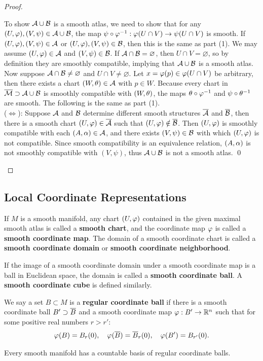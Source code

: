 \begin{proof}
\begin{enumerate}
    To show $\mathcal{A} \cup \mathcal{B}$ is a smooth atlas, we need to show that for any $(U,\varphi), (V,\psi) \in \mathcal{A} \cup \mathcal{B}$, the map $\psi \circ \varphi^{-1}: \varphi(U \cap V) \to \psi(U \cap V)$ is smooth. If $(U,\varphi), (V,\psi) \in \mathcal{A}$ or $(U,\varphi), (V,\psi) \in \mathcal{B}$, then this is the same as part (1). We may assume $(U,\varphi) \in \mathcal{A}$ and $(V,\psi) \in \mathcal{B}$. 
    If $\mathcal{A} \cap \mathcal{B} = \varnothing$, then $U \cap V = \varnothing$, so by definition they are smoothly compatible, implying that $\mathcal{A} \cup \mathcal{B}$ is a smooth atlas. Now suppose $\mathcal{A} \cap \mathcal{B} \neq \varnothing$ and $U \cap V \neq \varnothing$. Let $x = \varphi(p) \in \varphi(U \cap V)$ be arbitrary, then there exists a chart $(W,\theta) \in \mathcal{A}$ with $p \in W$. Because every chart in $\overline{\mathcal{M}} \supset \mathcal{A} \cup \mathcal{B}$ is smoothly compatible with $(W,\theta)$, the maps $\theta \circ \varphi^{-1}$ and $\psi \circ \theta^{-1}$ are smooth. The following is the same as part (1). \\
    ($\Longleftrightarrow$): Suppose $\mathcal{A}$ and $\mathcal{B}$ determine different smooth structures $\overline{\mathcal{A}}$ and $\overline{\mathcal{B}}$, then there is a smooth chart $(U,\varphi) \in \overline{\mathcal{A}}$ such that $(U,\varphi) \notin \overline{\mathcal{B}}$. Then $(U,\varphi)$ is smoothly compatible with each $(A,\alpha) \in \mathcal{A}$, and there exists $(V,\psi) \in \mathcal{B}$ with which $(U,\varphi)$ is not compatible. 
    Since smooth compatibility is an equivalence relation, $(A,\alpha)$ is not smoothly compatible with $(V,\psi)$, thus $\mathcal{A} \cup \mathcal{B}$ is not a smooth atlas. \qed 
    \end{enumerate}
\end{proof}


\subsection{Local Coordinate Representations}
If $M$ is a smooth manifold, any chart $(U,\varphi)$ contained in the given maximal smooth atlas is called a \textbf{smooth chart}, and the coordinate map $\varphi$ is called a \textbf{smooth coordinate map}. The domain of a smooth coordinate chart is called a \textbf{smooth coordinate domain} or \textbf{smooth coordinate neighborhood}.

If the image of a smooth coordinate domain under a smooth coordinate map is a ball in Euclidean space, the domain is called a \textbf{smooth coordinate ball}. A \textbf{smooth coordinate cube} is defined similarly. 
\begin{definition}
    We say a set $B \subset M$ is a \textbf{regular coordinate ball} if there is a smooth coordinate ball $B' \supset \overline{B}$ and a smooth coordinate map $\varphi:B' \to \mathbb{R}^n$ such that for some positive real numbers $r > r'$:
    $$\varphi(B) = B_r(0), \quad \varphi(\overline{B}) = \overline{B}_r(0), \quad \varphi(B') = B_{r'}(0). $$
\end{definition}
\begin{proposition}
    Every smooth manifold has a countable basis of regular coordinate balls. 
\end{proposition}
